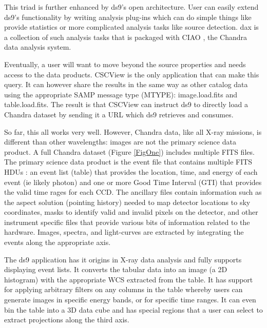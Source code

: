 \documentclass[11pt,twoside]{article}
\begin{document}
 This triad is further enhanced by ds9's open architecture.  User can easily 
extend ds9's 
functionality by writing analysis plug-ins which can do simple things like provide
statistics or more complicated analysis tasks like source detection.  dax \citep{2011ASPC..442..629G} 
is a collection of such analysis tasks that is packaged with CIAO \citep{2006SPIE.6270E..60F},
the Chandra data analysis system.


Eventually, a user will want to move beyond the source properties and 
needs access to the data products.  CSCView is the only application that
can make this query.  It can however share the results in the 
same way as other catalog data using the
appropriate SAMP message type (MTYPE): image.load.fits and table.load.fits.
The result is that CSCView can instruct ds9 to directly load a Chandra dataset
by sending it a URL which ds9 retrieves and consumes.



So far, this all works very well.  However, Chandra data, like all X-ray 
missions, is different than other wavelengths:  images are not the primary
science data product.
A full Chandra  dataset (Figure \ref{FigOne}) includes multiple FITS files. 
The primary science data product is the event file that contains multiple
FITS HDUs :  an event list (table) that provides the location, time, and
energy of each event (ie likely photon) and one or more Good Time Interval (GTI)
that provides the valid time rages for each CCD.  The ancillary files 
contain information such as the aspect solution (pointing history) needed
to map detector locations to sky coordinates, masks to identify valid and
invalid pixels on the detector, and other instrument specific files that
provide various bits of information related to the hardware.  Images,
spectra, and light-curves are extracted by integrating the events along
the appropriate axis.


The ds9 application has it origins in X-ray data analysis 
and fully supports displaying event lists.  It converts the tabular data into
an image (a 2D histogram) with the appropriate WCS extracted from the table. 
It has support for applying arbitrary filters on any columns in the table
whereby users can generate images in specific energy bands, or for specific 
time ranges.  It can even bin the table into a 3D data cube and has special
regions that a user can select to extract projections along the third axis.
\end{document}
